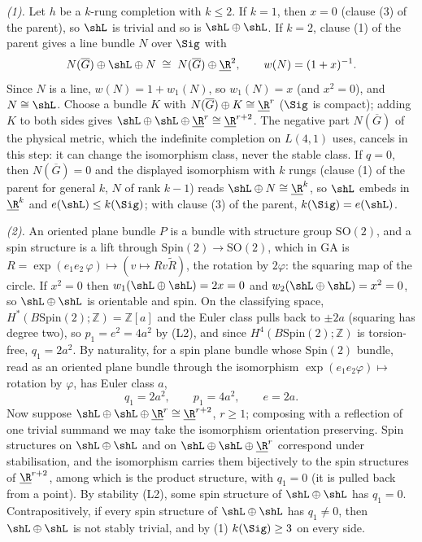 \emph{(1).} Let $h$ be a $k$-rung completion with $k \le 2$. If $k = 1$, then $x = 0$ (clause (3) of the parent), so $\shL$ is trivial and so is $\shL \oplus \shL$. If $k = 2$, clause (1) of the parent gives a line bundle $N$ over $\Sig$ with
\[
N(\overline G) \oplus \shL \oplus N \;\cong\; N(\overline G) \oplus \underline{\R}^{2}, \qquad w(N) = (1 + x)^{-1}.
\]
Since $N$ is a line, $w(N) = 1 + w_{1}(N)$, so $w_{1}(N) = x$ (and $x^{2} = 0$), and $N \cong \shL$. Choose a bundle $K$ with $N(\overline G) \oplus K \cong \underline{\R}^{r}$ ($\Sig$ is compact); adding $K$ to both sides gives $\shL \oplus \shL \oplus \underline{\R}^{r} \cong \underline{\R}^{r+2}$. The negative part $N(\overline G)$ of the physical metric, which the indefinite completion on $L(4,1)$ uses, cancels in this step: it can change the isomorphism class, never the stable class. If $q = 0$, then $N(\overline G) = 0$ and the displayed isomorphism with $k$ rungs (clause (1) of the parent for general $k$, $N$ of rank $k - 1$) reads $\shL \oplus N \cong \underline{\R}^{k}$, so $\shL$ embeds in $\underline{\R}^{k}$ and $e(\shL) \le k(\Sig)$; with clause (3) of the parent, $k(\Sig) = e(\shL)$.

\emph{(2).} An oriented plane bundle $P$ is a bundle with structure group $\mathrm{SO}(2)$, and a spin structure is a lift through $\mathrm{Spin}(2) \to \mathrm{SO}(2)$, which in GA is $R = \exp(e_{1}e_{2}\,\varphi) \mapsto (v \mapsto R v \tilde R)$, the rotation by $2\varphi$: the squaring map of the circle. If $x^{2} = 0$ then $w_{1}(\shL \oplus \shL) = 2x = 0$ and $w_{2}(\shL \oplus \shL) = x^{2} = 0$, so $\shL \oplus \shL$ is orientable and spin. On the classifying space, $H^{*}(B\mathrm{Spin}(2); \mathbb{Z}) = \mathbb{Z}[a]$ and the Euler class pulls back to $\pm 2a$ (squaring has degree two), so $p_{1} = e^{2} = 4a^{2}$ by (L2), and since $H^{4}(B\mathrm{Spin}(2); \mathbb{Z})$ is torsion-free, $q_{1} = 2a^{2}$. By naturality, for a spin plane bundle whose $\mathrm{Spin}(2)$ bundle, read as an oriented plane bundle through the isomorphism $\exp(e_{1}e_{2}\varphi) \mapsto$ rotation by $\varphi$, has Euler class $a$,
\[
q_{1} = 2a^{2}, \qquad p_{1} = 4a^{2}, \qquad e = 2a .
\]
Now suppose $\shL \oplus \shL \oplus \underline{\R}^{r} \cong \underline{\R}^{r+2}$, $r \geq 1$; composing with a reflection of one trivial summand we may take the isomorphism orientation preserving. Spin structures on $\shL \oplus \shL$ and on $\shL \oplus \shL \oplus \underline{\R}^{r}$ correspond under stabilisation, and the isomorphism carries them bijectively to the spin structures of $\underline{\R}^{r+2}$, among which is the product structure, with $q_{1} = 0$ (it is pulled back from a point). By stability (L2), some spin structure of $\shL \oplus \shL$ has $q_{1} = 0$. Contrapositively, if every spin structure of $\shL \oplus \shL$ has $q_{1} \neq 0$, then $\shL \oplus \shL$ is not stably trivial, and by (1) $k(\Sig) \geq 3$ on every side.

